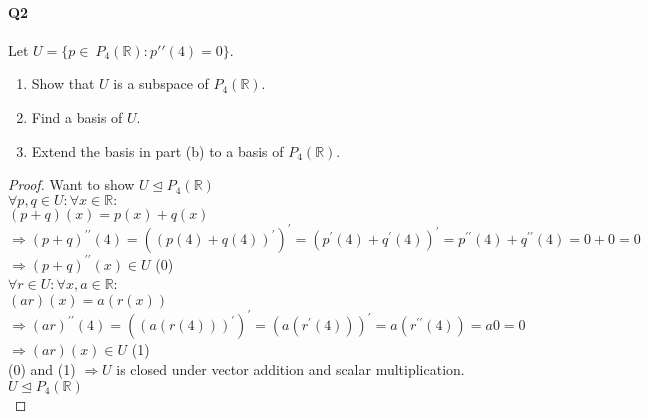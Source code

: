 \documentclass{article}
\begin{document}
\paragraph{Q2} Let $U = \{p ∈\ P_4(\mathbb{R}) : p′′(4) = 0\}$.
\begin{enumerate}[label=(\alph*)]
\item Show that $U$ is a subspace of $P_4(\mathbb{R})$.
\item Find a basis of $U$.
\item Extend the basis in part (b) to a basis of $P_4(\mathbb{R})$.
\end{enumerate}

\begin{proof} Want to show $U\trianglelefteq P_4(\mathbb{R})$\\
  $\forall p,q \in U: \forall x \in \mathbb{R}:$\\
  $(p+q)(x) = p(x)+q(x)$\\
  $\Rightarrow (p+q)^{\prime\prime}(4) = ((p(4)+q(4))^\prime)^\prime=
  (p^\prime(4)+q^\prime(4))^\prime = p^{\prime\prime}(4) +
  q^{\prime\prime}(4) = 0 + 0 = 0$\\
  $\Rightarrow (p+q)^{\prime\prime}(x) \in U$ (0)\\
  $\forall r \in U: \forall x,a \in \mathbb{R}$:\\
  $(ar)(x)= a(r(x))$\\
  $\Rightarrow (ar)^{\prime\prime}(4) = ((a(r(4)))^{\prime})^\prime=
  (a(r^{\prime}(4)))^\prime = a(r^{\prime\prime}(4)) = a0 = 0$\\
  $\Rightarrow (ar)(x) \in U$ (1)\\
  (0) and (1) $\Rightarrow U$ is closed under vector addition and
  scalar multiplication.\\
  $U\trianglelefteq P_4(\mathbb{R})$\\
\end{proof}
\end{document}
